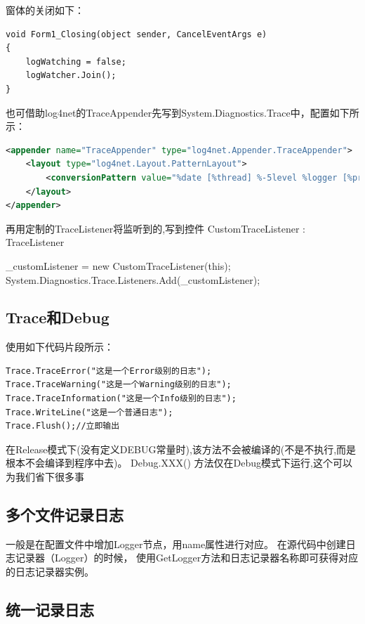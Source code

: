 \documentclass{book}
\begin{document}
窗体的关闭如下：
\begin{lstlisting}[language={[Sharp]C}]
 void Form1_Closing(object sender, CancelEventArgs e)
{
    logWatching = false;
    logWatcher.Join();
}
\end{lstlisting}


也可借助log4net的TraceAppender先写到System.Diagnostics.Trace中，配置如下所示：

\begin{lstlisting}[language=XML]
<appender name="TraceAppender" type="log4net.Appender.TraceAppender">
    <layout type="log4net.Layout.PatternLayout">
        <conversionPattern value="%date [%thread] %-5level %logger [%property{NDC}] - %message%newline" />
    </layout>
</appender>
\end{lstlisting}

再用定制的TraceListener将监听到的,写到控件
 CustomTraceListener : TraceListener

      \_customListener = new CustomTraceListener(this);
      System.Diagnostics.Trace.Listeners.Add(\_customListener);      

\subsection{Trace和Debug}

使用如下代码片段所示：

\begin{lstlisting}[language={[Sharp]C}]
Trace.TraceError("这是一个Error级别的日志");
Trace.TraceWarning("这是一个Warning级别的日志");
Trace.TraceInformation("这是一个Info级别的日志");
Trace.WriteLine("这是一个普通日志");
Trace.Flush();//立即输出
\end{lstlisting}

在Release模式下(没有定义DEBUG常量时),该方法不会被编译的(不是不执行,而是根本不会编译到程序中去)。
Debug.XXX() 方法仅在Debug模式下运行,这个可以为我们省下很多事

\subsection{多个文件记录日志}

一般是在配置文件中增加Logger节点，用name属性进行对应。
在源代码中创建日志记录器（Logger）的时候，
使用GetLogger方法和日志记录器名称即可获得对应的日志记录器实例。

\subsection{统一记录日志}
\end{document}
